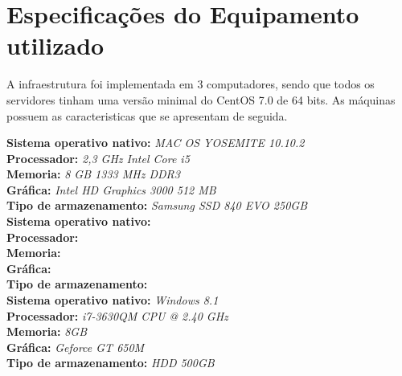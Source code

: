 \section{Especificações do Equipamento utilizado}

A infraestrutura foi implementada em 3 computadores, sendo que todos os servidores tinham uma versão minimal do CentOS 7.0 de 64 bits. As máquinas possuem as caracteristicas que se apresentam de seguida.

\textbf{Sistema operativo nativo:} \textit{MAC OS YOSEMITE 10.10.2} \\
\textbf{Processador:} \textit{2,3 GHz Intel Core i5} \\
\textbf{Memoria:} \textit{8 GB 1333 MHz DDR3} \\
\textbf{Gráfica:} \textit{Intel HD Graphics 3000 512 MB} \\
\textbf{Tipo de armazenamento:} \textit{Samsung SSD 840 EVO 250GB} \\

\textbf{Sistema operativo nativo:} \textit{} \\
\textbf{Processador:} \textit{} \\
\textbf{Memoria:} \textit{} \\
\textbf{Gráfica:} \textit{} \\
\textbf{Tipo de armazenamento:} \textit{} \\

\textbf{Sistema operativo nativo:} \textit{Windows 8.1} \\
\textbf{Processador:} \textit{i7-3630QM CPU @ 2.40 GHz} \\
\textbf{Memoria:} \textit{8GB} \\
\textbf{Gráfica:} \textit{Geforce GT 650M} \\
\textbf{Tipo de armazenamento:} \textit{HDD 500GB} \\
